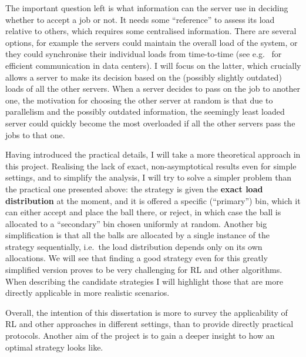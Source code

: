 The important question left is what information can the server use in deciding whether to accept a job or not. It needs some ``reference'' to assess its load relative to others, which requires some centralised information. There are several options, for example the servers could maintain the overall load of the system, or they could synchronise their individual loads from time-to-time (see e.g.~\cite{zhang2018datacenterloadbalancing} for efficient communication in data centers). I will focus on the latter, which crucially allows a server to make its decision based on the (possibly slightly outdated) loads of all the other servers. When a server decides to pass on the job to another one, the motivation for choosing the other server at random is that due to parallelism and the possibly outdated information, the seemingly least loaded server could quickly become the most overloaded if all the other servers pass the jobs to that one.


Having introduced the practical details, I will take a more theoretical approach in this project. Realising the lack of exact, non-asymptotical results even for simple settings, and to simplify the analysis, I will try to solve a simpler problem than the practical one presented above: the strategy is given the \textbf{exact load distribution} at the moment, and it is offered a specific (``primary'') bin, which it can either accept and place the ball there, or reject, in which case the ball is allocated to a ``secondary'' bin chosen uniformly at random. Another big simplification is that all the balls are allocated by a single instance of the strategy sequentially, i.e.\ the load distribution depends only on its own allocations. We will see that finding a good strategy even for this greatly simplified version proves to be very challenging for RL and other algorithms. When describing the candidate strategies I will highlight those that are more directly applicable in more realistic scenarios. 


Overall, the intention of this dissertation is more to survey the applicability of RL and other approaches in different settings, than to provide directly practical protocols. Another aim of the project is to gain a deeper insight to how an optimal strategy looks like.

